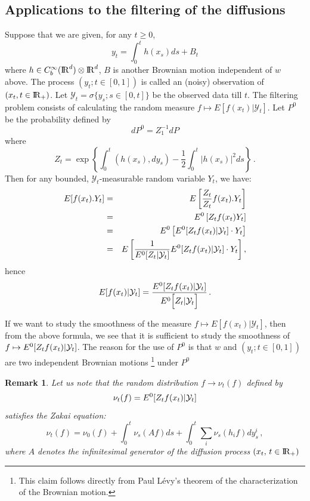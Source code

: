 \documentclass[12pt,a4paper]{book}
\newtheorem{remarkk}[theorem]{Remark}
\newcommand{\reals}{{\rm I\!R}}
\newcommand{\calY}{{\cal Y}}
\newcommand{\R}{{\rm I\!R}}
\begin{document}
\subsection{Applications to the filtering of
  the diffusions}
Suppose that we are given, for any $t\geq 0$,
$$
y_t=\int_0^t h(x_s)ds+B_t
$$
where $h\in
C_b^\infty(\R^d)\otimes\R^d$, $B$ is another Brownian motion independent of $w$
above. The process $(y_t;t\in[0,1])$ is called an (noisy) observation  of
$(x_t,t\in \reals_+)$. Let ${\mathcal Y}_t=\sigma\{y_s;s\in[0,t]\}$ be
the observed
data till $t$. The filtering problem consists of calculating the
random measure $f\mapsto E[f(x_t)|{\mathcal Y}_t]$. Let $P^0$ be the
probability defined by
$$
dP^0=Z_1^{-1}dP
$$
where
$$
Z_t=\exp\left\{\int_0^t (h(x_s),dy_s)-\frac{1}{2}
  \int_0^t|h(x_s)|^2ds\right\}\,.
$$
Then for any bounded, ${\mathcal Y}_t$-measurable random variable
$Y_t$, we have:
\begin{eqnarray*}
E[f(x_t).Y_t] & = & E\left[\frac{Z_t}{Z_t}f(x_t).Y_t\right]\\
&=&E^0\left[Z_tf(x_t)Y_t\right] \\
& = & E^0\left[E^0[Z_tf(x_t)|{\calY}_t]\cdot Y_t\right] \\
& = & E\left[ \frac{1}{E^0[Z_t|{\calY}_t]}E^0[Z_tf(x_t)|{\calY}_t]\cdot Y_t\right],
\end{eqnarray*}
hence
$$
E[f(x_t)|{\calY}_t]= \frac{E^0[Z_tf(x_t)|{\mathcal
Y}_t]}{E^0\Big[Z_t|{\calY}_t\Big]}\,.
$$

\noindent
If we want to study the smoothness of the measure $f\mapsto E[f(x_t)|{\mathcal
Y}_t]$, then from the above formula, we see that it is sufficient to study the
smoothness of $f\mapsto E^0[Z_tf(x_t)|{\calY}_t]$. The reason for the
use of $P^0$  is that
$w$ and $(y_t;t\in[0,1])$ are two independent Brownian motions
\footnote{ This claim follows directly from Paul L\'evy's theorem of
  the characterization of the Brownian motion.} under $P^0$
\begin{remarkk}
{\rm Let us note that the random distribution $f\to \nu_t(f)$ defined
  by
$$
\nu_t(f)= E^0[Z_tf(x_t)|{\calY}_t]
$$
 satisfies the Zakai equation:
$$
\nu_t(f)=\nu_0(f)+\int_0^t\nu_s(Af)ds+\int_0^t\sum_{i}\nu_s(h_if)dy^i_s\,,
$$
where $A$ denotes the infinitesimal generator of the diffusion process
$(x_t,\,t\in \reals_+)$}
\end{remarkk}
\end{document}
